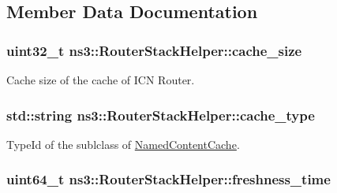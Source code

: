 \subsection{Member Data Documentation}
\hypertarget{classns3_1_1RouterStackHelper_af1bcf688f4db05e771f97c5cc3f151b9}{
\subsubsection[{cache\-\_\-size}]{\setlength{\rightskip}{0pt plus 5cm}uint32\-\_\-t ns3\-::\-Router\-Stack\-Helper\-::cache\-\_\-size\hspace{0.3cm}{\ttfamily [private]}}}\label{classns3_1_1RouterStackHelper_af1bcf688f4db05e771f97c5cc3f151b9}


Cache size of the cache of I\-C\-N Router. 

\hypertarget{classns3_1_1RouterStackHelper_a00676974faf0f9061cdfa64e2b2481f3}{
\subsubsection[{cache\-\_\-type}]{\setlength{\rightskip}{0pt plus 5cm}std\-::string ns3\-::\-Router\-Stack\-Helper\-::cache\-\_\-type\hspace{0.3cm}{\ttfamily [private]}}}\label{classns3_1_1RouterStackHelper_a00676974faf0f9061cdfa64e2b2481f3}


Type\-Id of the sublclass of \hyperlink{classns3_1_1NamedContentCache}{Named\-Content\-Cache}. 

\hypertarget{classns3_1_1RouterStackHelper_abde25db92b103214ca320f74a3fea16f}{
\subsubsection[{freshness\-\_\-time}]{\setlength{\rightskip}{0pt plus 5cm}uint64\-\_\-t ns3\-::\-Router\-Stack\-Helper\-::freshness\-\_\-time\hspace{0.3cm}{\ttfamily [private]}}}\label{classns3_1_1RouterStackHelper_abde25db92b103214ca320f74a3fea16f}


